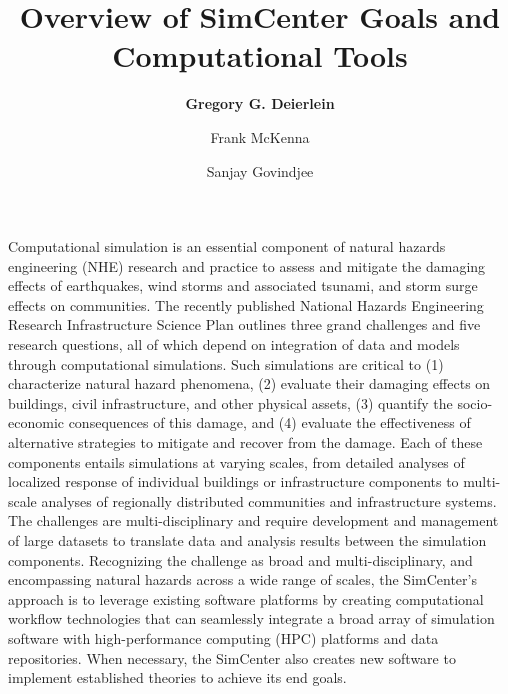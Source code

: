 %
%
%

\title{Overview of SimCenter Goals and Computational Tools}
\author{
    \textbf{Gregory G. Deierlein}
    \and Frank McKenna
    \and Sanjay Govindjee}
\tocauthor{}
%
%
\maketitle
\label{chapter:intro}

Computational simulation is an essential component of natural hazards engineering (NHE) research and practice to assess and mitigate the damaging effects of earthquakes, wind storms and associated tsunami, and storm surge effects on communities. The recently published National Hazards Engineering Research Infrastructure Science Plan \citep{edge2020natural} outlines three grand challenges and five research questions, all of which depend on integration of data and models through computational simulations.  Such simulations are critical to (1) characterize natural hazard phenomena, (2) evaluate their damaging effects on buildings, civil infrastructure, and other physical assets, (3) quantify the socio-economic consequences of this damage, and (4) evaluate the effectiveness of alternative strategies to mitigate and recover from the damage.  Each of these components entails simulations at varying scales, from detailed analyses of localized response of individual buildings or infrastructure components to multi-scale analyses of regionally distributed communities and infrastructure systems.  The challenges are multi-disciplinary and require development and management of large datasets to translate data and analysis results between the simulation components. Recognizing the challenge as broad and multi-disciplinary, and encompassing natural hazards across a wide range of scales, the SimCenter’s approach is to leverage existing software platforms by creating computational workflow technologies that can seamlessly integrate a broad array of simulation software with high-performance computing (HPC) platforms and data repositories. When necessary, the SimCenter also creates new software to implement established theories to achieve its end goals.

